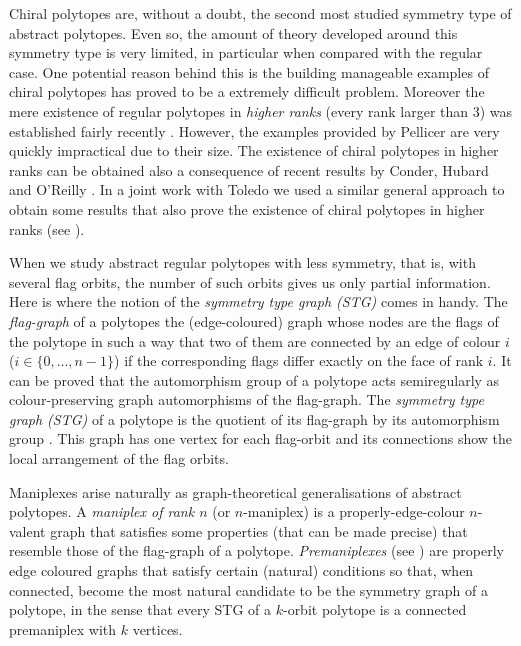 Chiral polytopes are, without a doubt, the second most studied symmetry type of abstract polytopes. 
Even so, the amount of theory developed around this symmetry type is very limited, in particular when compared with the regular case. 
One potential reason behind this is the building manageable examples of chiral polytopes has proved to be a extremely difficult problem. 
Moreover the mere existence of regular polytopes in \emph{higher ranks} (every rank larger than $3$) was established fairly recently \cite{Pellicer2010_ConstructionHigherRank}. 
However, the examples provided by Pellicer are very quickly impractical due to their size.
The existence of chiral polytopes in higher ranks can be obtained also a consequence of recent results by Conder, Hubard and O'Reilly \cite*{CondHubORe2024_ConstructionChiralPolytopes}.
In a joint work with Toledo we used a similar general approach to obtain some results that also prove the existence of chiral polytopes in higher ranks (see \cite{MonteToled_ChiralExtensionsRegular_preprint}). 

When we study abstract regular polytopes with less symmetry, that is, with several flag orbits, the number of such orbits gives us only  partial information. 
Here is where the notion of the \emph{symmetry type graph (STG)} comes in handy. 
The \emph{flag-graph} of a polytopes the (edge-coloured) graph whose nodes are the flags of the polytope in such a way that two of them are connected by an edge of colour $i$ ($i \in \{0, \dots, n-1\}$) if the corresponding flags differ exactly on the face of rank $i$.
It can be proved that the automorphism group of a polytope acts semiregularly as colour-preserving graph automorphisms of the flag-graph. 
The \emph{symmetry type graph (STG)} of a polytope is the quotient of its flag-graph by its automorphism group
\cite{CunDelHuTo2015_SymmetryTypeGraphs}.
This graph has one vertex for each flag-orbit and its connections show the local arrangement of the flag orbits. 

Maniplexes arise naturally as graph-theoretical generalisations of abstract polytopes. 
A \emph{maniplex of rank $n$} (or $n$-maniplex) is a properly-edge-colour $n$-valent graph that satisfies some properties (that can be made precise) that resemble those of the flag-graph of a polytope.
\emph{Premaniplexes} (see \cite{HubaMocMon2023_VoltageOperationsManiplexes,HubarMocha2023_AllPolytopesAre}) are properly edge coloured graphs that satisfy certain (natural) conditions so that, when connected, become the most natural candidate to be the symmetry graph of a polytope, in the sense that every STG of a $k$-orbit polytope is a connected premaniplex with $k$ vertices.


